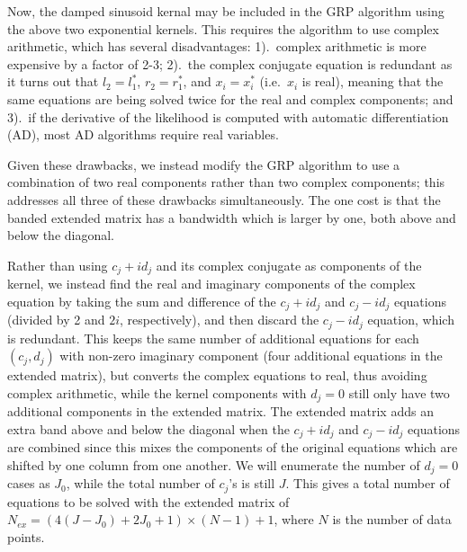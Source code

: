 \documentclass[manuscript, letterpaper]{aastex6}
\begin{document}
Now, the damped sinusoid kernal may be included in the GRP algorithm
using the above two exponential kernels.  This
requires the algorithm to use complex arithmetic, which has several disadvantages:
1).\ complex arithmetic is more expensive by a factor of 2-3; 2).\ the complex conjugate equation
is redundant as it turns out that $l_2 = l_1^*$, $r_2 = r_1^*$, and $x_i = x_i^*$ (i.e.\ $x_i$ is
real), meaning that the same equations are being solved twice for the real and complex components;
and 3).\ if the derivative of the likelihood is computed with automatic
differentiation (AD), most AD algorithms require real variables.

Given these drawbacks, we instead modify the GRP algorithm to use a combination of two real
components rather than two complex components;  this addresses all three of these drawbacks
simultaneously.  The one cost is that the banded extended matrix has a bandwidth which is
larger by one, both above and below the diagonal.

Rather than using $c_j+id_j$ and its complex conjugate as components of the kernel, we instead
find the real and imaginary components of the complex equation by taking the
sum and difference of the $c_j+id_j$ and $c_j-id_j$ equations (divided by 2 and $2i$, respectively),
and then discard the $c_j-id_j$ equation, which is redundant.  This keeps the same number of
additional equations for each $(c_j,d_j)$ with non-zero imaginary component (four additional
equations in the extended matrix), but converts the complex equations to real, thus avoiding
complex arithmetic, while the kernel components with $d_j=0$ still only have two
additional components in the extended matrix.  The extended matrix adds an extra band above
and below the diagonal when the $c_j+id_j$ and $c_j-id_j$ equations are combined since this
mixes the components of the original equations which are shifted by one column from one
another.  We will enumerate the number of $d_j=0$ cases as $J_0$, while the total number
of $c_j$'s is still $J$.  This gives a total number of equations to be solved with the
extended matrix of $N_{ex}= (4(J-J_0)+2J_0+1)\times(N-1)+1$, where $N$ is the number of data
points.

\end{document}
